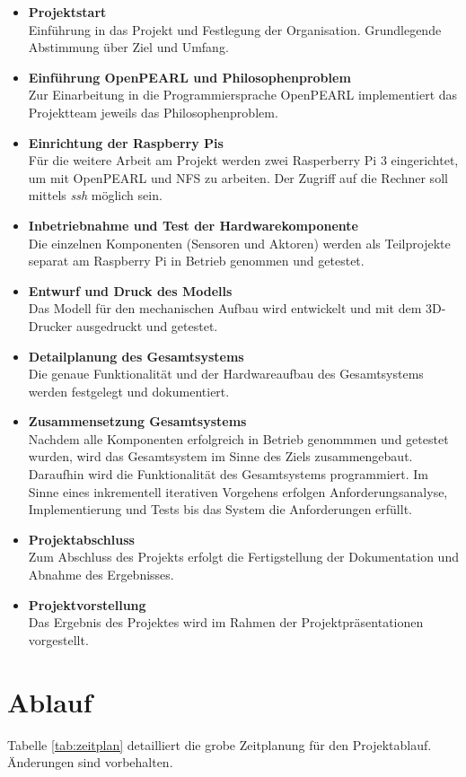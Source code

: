 	\begin{itemize}
		\item \textbf{Projektstart}\\
		Einführung in das Projekt und Festlegung der Organisation. Grundlegende Abstimmung über Ziel und Umfang.
		\item \textbf{Einführung OpenPEARL und Philosophenproblem}\\
		 Zur Einarbeitung in die Programmiersprache OpenPEARL implementiert das Projektteam jeweils das Philosophenproblem.
		\item \textbf{Einrichtung der Raspberry Pis}\\
		 Für die weitere Arbeit am Projekt werden zwei Rasperberry Pi 3 eingerichtet, um mit OpenPEARL und NFS zu arbeiten. Der Zugriff auf die Rechner soll mittels \emph{ssh} möglich sein.
		\item \textbf{Inbetriebnahme und Test der Hardwarekomponente}\\  Die einzelnen Komponenten (Sensoren und Aktoren) werden als Teilprojekte separat am Raspberry Pi in Betrieb genommen und getestet.
		\item \textbf{Entwurf und Druck des Modells}\\
		Das Modell für den mechanischen Aufbau wird entwickelt und mit dem 3D-Drucker ausgedruckt und getestet.
		\item \textbf{Detailplanung des Gesamtsystems}\\  Die genaue Funktionalität und der Hardwareaufbau des Gesamtsystems werden festgelegt und dokumentiert.
		\item \textbf{Zusammensetzung Gesamtsystems}\\
		Nachdem alle Komponenten erfolgreich in Betrieb genommmen und getestet wurden, wird das Gesamtsystem im Sinne des Ziels zusammengebaut. Daraufhin wird die Funktionalität des Gesamtsystems programmiert. Im Sinne eines inkrementell iterativen Vorgehens erfolgen Anforderungsanalyse, Implementierung und Tests bis das System die Anforderungen erfüllt.
		\item \textbf{Projektabschluss}\\
		Zum Abschluss des Projekts erfolgt die Fertigstellung der Dokumentation und Abnahme des Ergebnisses.
		\item \textbf{Projektvorstellung}\\
		Das Ergebnis des Projektes wird im Rahmen der Projektpräsentationen vorgestellt.
	\end{itemize}

	\section{Ablauf}
	Tabelle \ref{tab:zeitplan} detailliert die grobe Zeitplanung für den Projektablauf. Änderungen sind vorbehalten.\\
	
